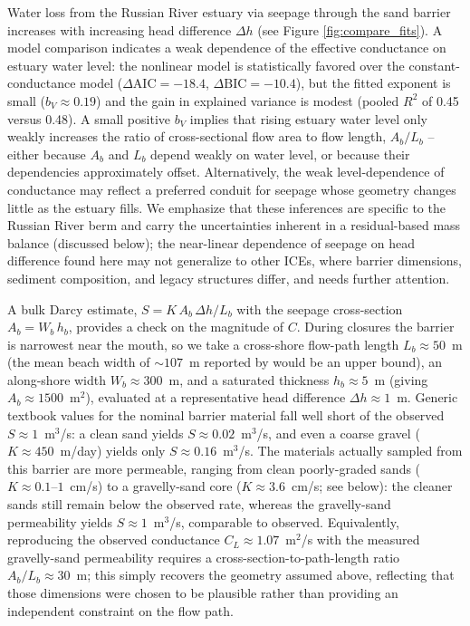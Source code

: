 \documentclass[preprint,12pt,authoryear]{elsarticle}
\begin{document}
Water loss from the Russian River estuary via seepage through the sand barrier increases with increasing head difference $\Delta h$ (see Figure \ref{fig:compare_fits}). A model comparison indicates a weak dependence of the effective conductance on estuary water level: the nonlinear model is statistically favored over the constant-conductance model ($\Delta\mathrm{AIC} = -18.4$, $\Delta\mathrm{BIC} = -10.4$), but the fitted exponent is small ($b_V \approx 0.19$) and the gain in explained variance is modest (pooled $R^2$ of 0.45 versus 0.48). A small positive $b_V$ implies that rising estuary water level only weakly increases the ratio of cross-sectional flow area to flow length, $A_b/L_b$ -- either because $A_b$ and $L_b$ depend weakly on water level, or because their dependencies approximately offset. Alternatively, the weak level-dependence of conductance may reflect a preferred conduit for seepage whose geometry changes little as the estuary fills. We emphasize that these inferences are specific to the Russian River berm and carry the uncertainties inherent in a residual-based mass balance (discussed below); the near-linear dependence of seepage on head difference found here may not generalize to other ICEs, where barrier dimensions, sediment composition, and legacy structures differ, and needs further attention.

A bulk Darcy estimate, $S = K\,A_b\,\Delta h / L_b$ with the seepage cross-section $A_b = W_b\,h_b$, provides a check on the magnitude of $C$. During closures the barrier is narrowest near the mouth, so we take a cross-shore flow-path length $L_b \approx 50$~m (the mean beach width of ${\sim}107$~m reported by \citet{BehrensEtAl_2017_GoatRock} would be an upper bound), an along-shore width $W_b \approx 300$~m, and a saturated thickness $h_b \approx 5$~m (giving $A_b \approx 1500$~m$^2$), evaluated at a representative head difference $\Delta h \approx 1$~m. Generic textbook values for the nominal barrier material fall well short of the observed $S \approx 1$~m$^3$/s: a clean sand \citep[$K \approx 45$~m/day,][]{masters1991introduction} yields $S \approx 0.02$~m$^3$/s, and even a coarse gravel ($K \approx 450$~m/day) yields only $S \approx 0.16$~m$^3$/s. The materials actually sampled from this barrier are more permeable, ranging from clean poorly-graded sands ($K \approx 0.1$--$1$~cm/s) to a gravelly-sand core ($K \approx 3.6$~cm/s; see below): the cleaner sands still remain below the observed rate, whereas the gravelly-sand permeability yields $S \approx 1$~m$^3$/s, comparable to observed. Equivalently, reproducing the observed conductance $C_L \approx 1.07$~m$^2$/s with the measured gravelly-sand permeability requires a cross-section-to-path-length ratio $A_b/L_b \approx 30$~m; this simply recovers the geometry assumed above, reflecting that those dimensions were chosen to be plausible rather than providing an independent constraint on the flow path.
\end{document}
